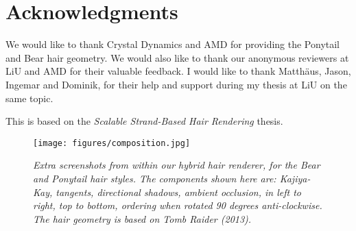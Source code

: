 \documentclass{egpubl}
\begin{document}
\section*{Acknowledgments}

We would like to thank Crystal Dynamics and AMD for providing the Ponytail and Bear hair geometry. We would also like to thank our anonymous reviewers at LiU and AMD for their valuable feedback. I would like to thank Matthäus, Jason, Ingemar and Dominik, for their help and support during my thesis at LiU on the same topic.

\noindent This is based on the \emph{Scalable Strand-Based Hair Rendering} thesis.

\nocite{*}

\printbibliography

\newpage

\begin{figure}[H]
    \centering
    \texttt{[image: figures/composition.jpg]}
    \caption{\emph{Extra screenshots from within our hybrid hair renderer, for the Bear and Ponytail hair styles. The components shown here are: Kajiya-Kay, tangents, directional shadows, ambient occlusion, in left to right, top to bottom, ordering when rotated 90 degrees anti-clockwise. The hair geometry is based on Tomb Raider (2013).}}
    \label{fig:representative}
\end{figure}
\end{document}
